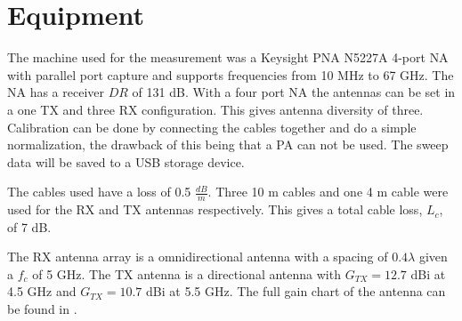 \section{Equipment}\label{equipment}
The machine used for the measurement was a Keysight PNA N5227A 4-port \gls{NA} with parallel port capture and supports frequencies from 10 MHz to 67 GHz. The NA has a receiver $DR$ of 131 dB. With a four port NA the antennas can be set in a one TX and three RX configuration. This gives antenna diversity of three. Calibration can be done by connecting the cables together and do a simple normalization, the drawback of this being that a \gls{PA} can not be used. The sweep data will be saved to a USB storage device.


The cables used have a loss of 0.5 $\frac{dB}{m}$. Three 10 m cables and one 4 m cable were used for the RX and TX antennas respectively. This gives a total cable loss, $L_c$, of 7 dB.


The RX antenna array is a omnidirectional antenna with a spacing of $0.4 \lambda$ given a $f_c$ of 5 GHz. The TX antenna is a directional antenna with $G_{TX}=12.7$ dBi at 4.5 GHz and $G_{TX}=10.7$ dBi at 5.5 GHz. The full gain chart of the antenna can be found in . 

